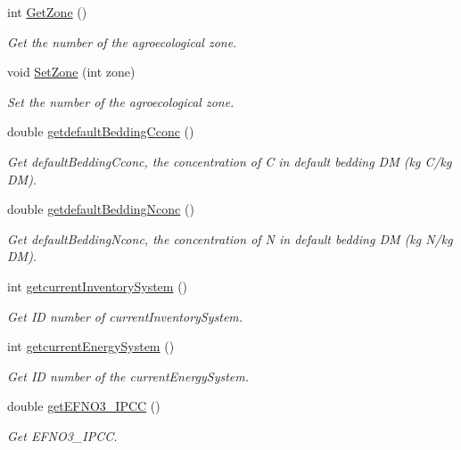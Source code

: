 \begin{DoxyCompactItemize}
int \mbox{\hyperlink{class_global_vars_a093efdf94804ab6ddbf94a475543ea15}{Get\+Zone}} ()
\begin{DoxyCompactList}\small\item\em Get the number of the agroecological zone. \end{DoxyCompactList}\item 
void \mbox{\hyperlink{class_global_vars_acbf66e9e99a98cb7d6e317afaba4519e}{Set\+Zone}} (int zone)
\begin{DoxyCompactList}\small\item\em Set the number of the agroecological zone. \end{DoxyCompactList}\item 
double \mbox{\hyperlink{class_global_vars_a00271cd8374815fb712fd09d1fed33ec}{getdefault\+Bedding\+Cconc}} ()
\begin{DoxyCompactList}\small\item\em Get default\+Bedding\+Cconc, the concentration of C in default bedding DM (kg C/kg DM). \end{DoxyCompactList}\item 
double \mbox{\hyperlink{class_global_vars_af89c033bb754a4798708e8ebb406c007}{getdefault\+Bedding\+Nconc}} ()
\begin{DoxyCompactList}\small\item\em Get default\+Bedding\+Nconc, the concentration of N in default bedding DM (kg N/kg DM). \end{DoxyCompactList}\item 
int \mbox{\hyperlink{class_global_vars_a59cda0c07140dd5fd81caaa15bad6c0f}{getcurrent\+Inventory\+System}} ()
\begin{DoxyCompactList}\small\item\em Get ID number of current\+Inventory\+System. \end{DoxyCompactList}\item 
int \mbox{\hyperlink{class_global_vars_a6d119976a50903086643fcadca3ceeac}{getcurrent\+Energy\+System}} ()
\begin{DoxyCompactList}\small\item\em Get ID number of the current\+Energy\+System. \end{DoxyCompactList}\item 
double \mbox{\hyperlink{class_global_vars_a60ea4b52b54edb112daca357ed838ef9}{get\+E\+F\+N\+O3\+\_\+\+I\+P\+CC}} ()
\begin{DoxyCompactList}\small\item\em Get E\+F\+N\+O3\+\_\+\+I\+P\+CC. \end{DoxyCompactList}\item 

\end{DoxyCompactItemize}
